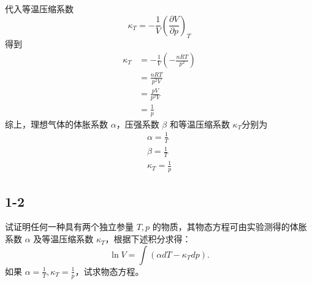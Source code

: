 代入等温压缩系数
\begin{equation}
    \kappa _T=-\frac{1}{V}\left( \frac{\partial V}{\partial p} \right) _T
\end{equation}
得到
\begin{equation}
    \begin{aligned}
        \kappa _T&=-\frac{1}{V}\left( -\frac{nRT}{p^2} \right) 
\\
&=\frac{nRT}{p^2V}
\\
&=\frac{pV}{p^2V}
\\
&=\frac{1}{p}
    \end{aligned}
\end{equation}
综上，理想气体的体胀系数 $\alpha$，压强系数 $\beta$ 和等温压缩系数 $\kappa_T$分别为
\begin{equation}
    \begin{aligned}
        \alpha =\frac{1}{T}
\\
\beta =\frac{1}{T}
\\
\kappa _T=\frac{1}{p}
    \end{aligned}
\end{equation}









\newpage
\subsection{1-2}
试证明任何一种具有两个独立参量 $T, p$ 的物质，其物态方程可由实验测得的体胀系数 $\alpha$ 及等温压缩系数 $\kappa_T$，根据下述积分求得：
$$\ln V = \int (\alpha dT - \kappa_T dp).$$
如果 $\alpha = \frac{1}{T}, \kappa_T = \frac{1}{p}$，试求物态方程。


